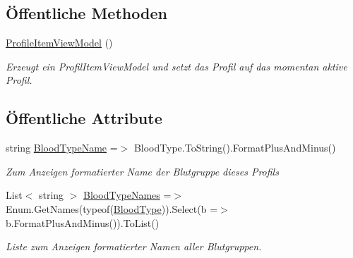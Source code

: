 \subsection*{Öffentliche Methoden}
\begin{DoxyCompactItemize}
\item 
\mbox{\hyperlink{classmy_m_d_1_1_view_model_1_1_profile_tab_view_model_1_1_profile_item_view_model_ae846bc0f8c6962ada62fa7f9a4640d1d}{Profile\+Item\+View\+Model}} ()
\begin{DoxyCompactList}\small\item\em Erzeugt ein Profil\+Item\+View\+Model und setzt das Profil auf das momentan aktive Profil. \end{DoxyCompactList}\end{DoxyCompactItemize}
\subsection*{Öffentliche Attribute}
\begin{DoxyCompactItemize}
\item 
string \mbox{\hyperlink{classmy_m_d_1_1_view_model_1_1_profile_tab_view_model_1_1_profile_item_view_model_a8f900454a817a4b4400ede47e418a512}{Blood\+Type\+Name}} =$>$ Blood\+Type.\+To\+String().Format\+Plus\+And\+Minus()
\begin{DoxyCompactList}\small\item\em Zum Anzeigen formatierter Name der Blutgruppe dieses Profils \end{DoxyCompactList}\item 
List$<$ string $>$ \mbox{\hyperlink{classmy_m_d_1_1_view_model_1_1_profile_tab_view_model_1_1_profile_item_view_model_af9b06e26394989f3cb500fe452a25ce8}{Blood\+Type\+Names}} =$>$ Enum.\+Get\+Names(typeof(\mbox{\hyperlink{namespacemy_m_d_1_1_model_interface_1_1_data_model_interface_a5da1f31200b9d5cbc5d0704b8da3d17c}{Blood\+Type}})).Select(b =$>$ b.\+Format\+Plus\+And\+Minus()).To\+List()
\begin{DoxyCompactList}\small\item\em Liste zum Anzeigen formatierter Namen aller Blutgruppen. \end{DoxyCompactList}\end{DoxyCompactItemize}
